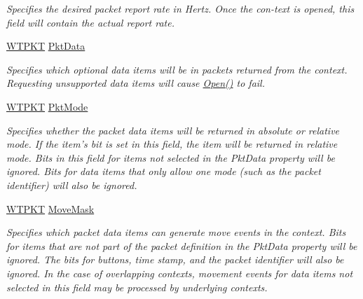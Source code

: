 \begin{DoxyCompactItemize}
\begin{DoxyCompactList}\small\item\em Specifies the desired packet report rate in Hertz. Once the con-\/text is opened, this field will contain the actual report rate. \item\end{DoxyCompactList}\item 
\hyperlink{class_wintab_d_n_1_1_w_t_p_k_t}{WTPKT} \hyperlink{class_wintab_d_n_1_1_c_wintab_context_a39ecf79368b666bcd96679d77a997e6d}{PktData}
\begin{DoxyCompactList}\small\item\em Specifies which optional data items will be in packets returned from the context. Requesting unsupported data items will cause \hyperlink{class_wintab_d_n_1_1_c_wintab_context_aeacb4b849d6ae7185451d0015d740a1c}{Open()} to fail. \item\end{DoxyCompactList}\item 
\hyperlink{class_wintab_d_n_1_1_w_t_p_k_t}{WTPKT} \hyperlink{class_wintab_d_n_1_1_c_wintab_context_ae49db54fc9d1569c95a902058c85dd3f}{PktMode}
\begin{DoxyCompactList}\small\item\em Specifies whether the packet data items will be returned in absolute or relative mode. If the item's bit is set in this field, the item will be returned in relative mode. Bits in this field for items not selected in the PktData property will be ignored. Bits for data items that only allow one mode (such as the packet identifier) will also be ignored. \item\end{DoxyCompactList}\item 
\hyperlink{class_wintab_d_n_1_1_w_t_p_k_t}{WTPKT} \hyperlink{class_wintab_d_n_1_1_c_wintab_context_af330693f2499261616e121c7604bac78}{MoveMask}
\begin{DoxyCompactList}\small\item\em Specifies which packet data items can generate move events in the context. Bits for items that are not part of the packet definition in the PktData property will be ignored. The bits for buttons, time stamp, and the packet identifier will also be ignored. In the case of overlapping contexts, movement events for data items not selected in this field may be processed by underlying contexts. \item\end{DoxyCompactList}\item 

\end{DoxyCompactItemize}
